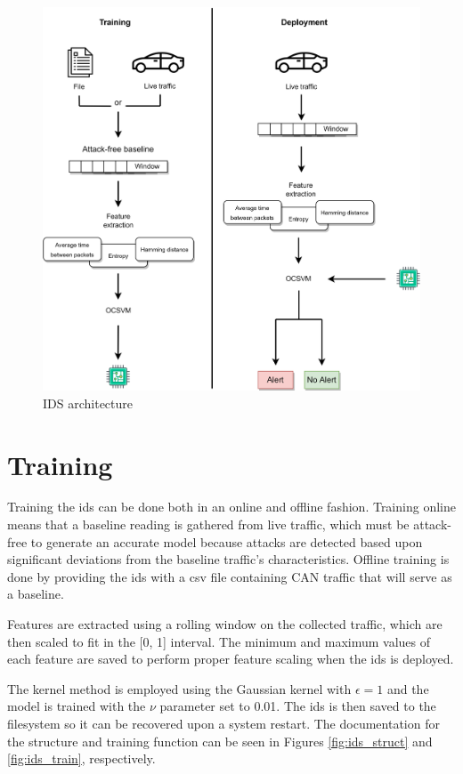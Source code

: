 \begin{figure}
    \centering
    \includegraphics[width = \textwidth]{img/parts/app/IDS.png}
    \caption{IDS architecture}
    \label{fig:ids_architecture}
\end{figure}

\section{Training}
\label{sec:app_training}

Training the \gls{ids} can be done both in an online and offline fashion. Training online means that a baseline reading is gathered from live traffic, which must be attack-free to generate an accurate model because attacks are detected based upon significant deviations from the baseline traffic's characteristics. Offline training is done by providing the \gls{ids} with a \gls{csv} file containing CAN traffic that will serve as a baseline.\par
Features are extracted using a rolling window on the collected traffic, which are then scaled to fit in the [0, 1] interval. The minimum and maximum values of each feature are saved to perform proper feature scaling when the \gls{ids} is deployed.\par
The kernel method is employed using the Gaussian kernel with $\epsilon = 1$ and the model is trained with the $\nu$ parameter set to 0.01. The \gls{ids} is then saved to the filesystem so it can be recovered upon a system restart. The documentation for the structure and training function can be seen in Figures \ref{fig:ids_struct} and \ref{fig:ids_train}, respectively.

